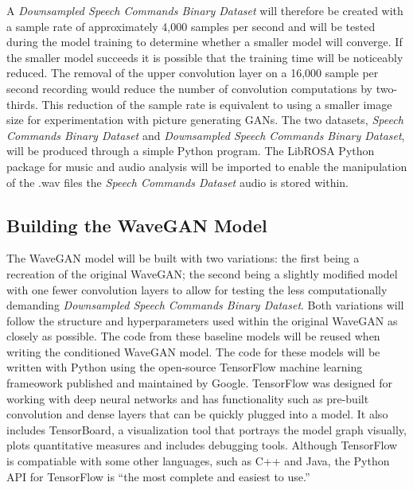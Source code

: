 \documentclass[a4paper, dvipsnames, titlepage]{article}
\begin{document}
\newline
\newline
A \textit{Downsampled Speech Commands Binary Dataset} will therefore be created with a sample rate of approximately 4,000 samples per second and will be tested during the model training to determine whether a smaller model will converge.
If the smaller model succeeds it is possible that the training time will be noticeably reduced.
The removal of the upper convolution layer on a 16,000 sample per second recording would reduce the number of convolution computations by two-thirds.
This reduction of the sample rate is equivalent to using a smaller image size for experimentation with picture generating GANs.
\newline
\newline
The two datasets, \textit{Speech Commands Binary Dataset} and \textit{Downsampled Speech Commands Binary Dataset}, will be produced through a simple Python program.
The LibROSA Python package for music and audio analysis will be imported to enable the manipulation of the .wav files the \textit{Speech Commands Dataset} audio is stored within.

\subsection{Building the WaveGAN Model}

The WaveGAN model will be built with two variations: the first being a recreation of the original WaveGAN; the second being a slightly modified model with one fewer convolution layers to allow for testing the less computationally demanding \textit{Downsampled Speech Commands Binary Dataset}.
Both variations will follow the structure and hyperparameters used within the original WaveGAN as closely as possible.
The code from these baseline models will be reused when writing the conditioned WaveGAN model.
\newline
\newline
The code for these models will be written with Python using the open-source TensorFlow machine learning frameowork published and maintained by Google.
TensorFlow was designed for working with deep neural networks and has functionality such as pre-built convolution and dense layers that can be quickly plugged into a model.
It also includes TensorBoard, a visualization tool that portrays the model graph visually, plots quantitative measures and includes debugging tools.
Although TensorFlow is compatiable with some other languages, such as C++ and Java, the Python API for TensorFlow is ``the most complete and easiest to use.'' \citep{TensorFlowAPI}
\end{document}
